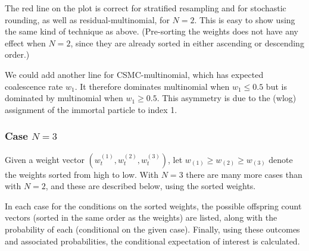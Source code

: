 \documentclass[fleqn]{article}
\theoremstyle{definition}
\newcommand{\wt}[2][t]{w_{#1}^{(#2)}}
\begin{document}
The red line on the plot is correct for stratified resampling and for stochastic rounding, as well as residual-multinomial, for $N=2$. This is easy to show using the same kind of technique as above. (Pre-sorting the weights does not have any effect when $N=2$, since they are already sorted in either ascending or descending order.)

We could add another line for CSMC-multinomial, which has expected coalescence rate $w_1$. It therefore dominates multinomial when $w_1 \leq 0.5$ but is dominated by multinomial when $w_1 \geq 0.5$. This asymmetry is due to the (wlog) assignment of the immortal particle to index 1. 


\subsubsection{Case $N=3$}
Given a weight vector $(\wt{1}, \wt{2}, \wt{3})$, let $w_{(1)} \geq w_{(2)} \geq w_{(3)}$ denote the weights sorted from high to low. 
With $N=3$ there are many more cases than with $N=2$, and these are described below, using the sorted weights.

In each case for the conditions on the sorted weights, the possible offspring count vectors (sorted in the same order as the weights) are listed, along with the probability of each (conditional on the given case). Finally, using these outcomes and associated probabilities, the conditional expectation of interest is calculated.\\
\end{document}
